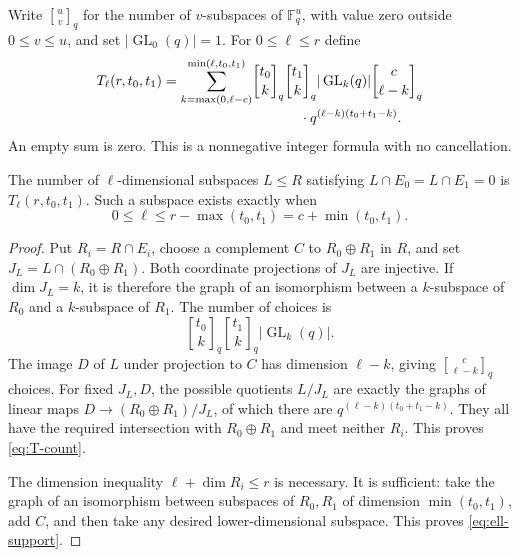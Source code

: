 Write $\genfrac{[}{]}{0pt}{}{u}{v}_q$ for the number of $v$-subspaces
of $\mathbb F_q^u$, with value zero outside $0\le v\le u$, and set
$|\operatorname{GL}_0(q)|=1$. For $0\le\ell\le r$ define
\begin{equation}\label{eq:T-count}
 \begin{split}
 T_\ell(r,t_0,t_1)=
 \sum_{k=\max(0,\ell-c)}^{\min(\ell,t_0,t_1)}
 &\genfrac{[}{]}{0pt}{}{t_0}{k}_q
 \genfrac{[}{]}{0pt}{}{t_1}{k}_q
 |\operatorname{GL}_k(q)|
 \genfrac{[}{]}{0pt}{}{c}{\ell-k}_q\\[-2pt]
 &\hspace{12mm}\cdot q^{(\ell-k)(t_0+t_1-k)}.
 \end{split}
\end{equation}
An empty sum is zero. This is a nonnegative integer formula with no
cancellation.

\begin{lemma}\label{lem:transverse-relations}
The number of $\ell$-dimensional subspaces $L\le R$ satisfying
$L\cap E_0=L\cap E_1=0$ is $T_\ell(r,t_0,t_1)$.
Such a subspace exists exactly when
\begin{equation}\label{eq:ell-support}
 0\le\ell\le r-\max(t_0,t_1)=c+\min(t_0,t_1).
\end{equation}
\end{lemma}

\begin{proof}
Put $R_i=R\cap E_i$, choose a complement $C$ to $R_0\oplus R_1$
in $R$, and set $J_L=L\cap(R_0\oplus R_1)$. Both coordinate
projections of $J_L$ are injective. If $\dim J_L=k$, it is therefore
the graph of an isomorphism between a $k$-subspace of $R_0$ and a
$k$-subspace of $R_1$. The number of choices is
\[
 \genfrac{[}{]}{0pt}{}{t_0}{k}_q
 \genfrac{[}{]}{0pt}{}{t_1}{k}_q|\operatorname{GL}_k(q)|.
\]
The image $D$ of $L$ under projection to $C$ has dimension $\ell-k$,
giving $\genfrac{[}{]}{0pt}{}{c}{\ell-k}_q$ choices.
For fixed $J_L,D$, the possible quotients $L/J_L$ are exactly the
graphs of linear maps
$D\longrightarrow(R_0\oplus R_1)/J_L$, of which there are
$q^{(\ell-k)(t_0+t_1-k)}$. They all have the required intersection
with $R_0\oplus R_1$ and meet neither $R_i$. This proves
\eqref{eq:T-count}.

The dimension inequality $\ell+\dim R_i\le r$ is necessary.
It is sufficient: take the graph of an isomorphism between subspaces
of $R_0,R_1$ of dimension $\min(t_0,t_1)$, add $C$, and then take
any desired lower-dimensional subspace. This proves \eqref{eq:ell-support}.
\end{proof}

